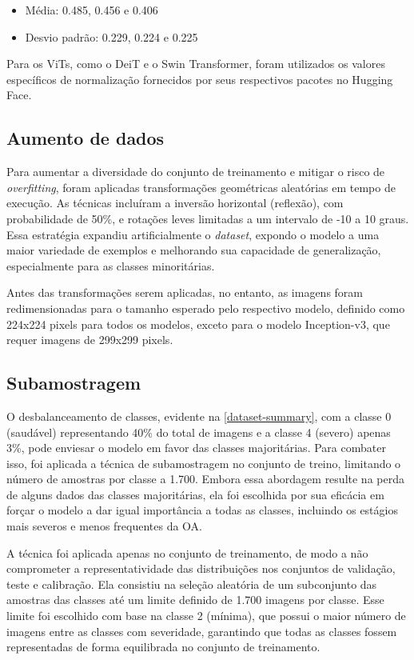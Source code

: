 \begin{itemize}
    \item Média: 0.485, 0.456 e 0.406
    \item Desvio padrão: 0.229, 0.224 e 0.225
\end{itemize}

Para os ViTs, como o DeiT e o Swin Transformer, foram utilizados os valores específicos de normalização fornecidos por seus respectivos pacotes no Hugging Face.

\subsection{Aumento de dados}

Para aumentar a diversidade do conjunto de treinamento e mitigar o risco de \textit{overfitting}, foram aplicadas transformações geométricas aleatórias em tempo de execução. As técnicas incluíram a inversão horizontal (reflexão), com probabilidade de 50\%, e rotações leves limitadas a um intervalo de -10 a 10 graus. Essa estratégia expandiu artificialmente o \textit{dataset}, expondo o modelo a uma maior variedade de exemplos e melhorando sua capacidade de generalização, especialmente para as classes minoritárias.

Antes das transformações serem aplicadas, no entanto, as imagens foram redimensionadas para o tamanho esperado pelo respectivo modelo, definido como 224x224 pixels para todos os modelos, exceto para o modelo Inception-v3, que requer imagens de 299x299 pixels.

\subsection{Subamostragem}

O desbalanceamento de classes, evidente na \autoref{dataset-summary}, com a classe 0 (saudável) representando 40\% do total de imagens e a classe 4 (severo) apenas 3\%, pode enviesar o modelo em favor das classes majoritárias. Para combater isso, foi aplicada a técnica de subamostragem no conjunto de treino, limitando o número de amostras por classe a 1.700. Embora essa abordagem resulte na perda de alguns dados das classes majoritárias, ela foi escolhida por sua eficácia em forçar o modelo a dar igual importância a todas as classes, incluindo os estágios mais severos e menos frequentes da OA.

A técnica foi aplicada apenas no conjunto de treinamento, de modo a não comprometer a representatividade das distribuições nos conjuntos de validação, teste e calibração. Ela consistiu na seleção aleatória de um subconjunto das amostras das classes até um limite definido de 1.700 imagens por classe. Esse limite foi escolhido com base na classe 2 (mínima), que possui o maior número de imagens entre as classes com severidade, garantindo que todas as classes fossem representadas de forma equilibrada no conjunto de treinamento.

